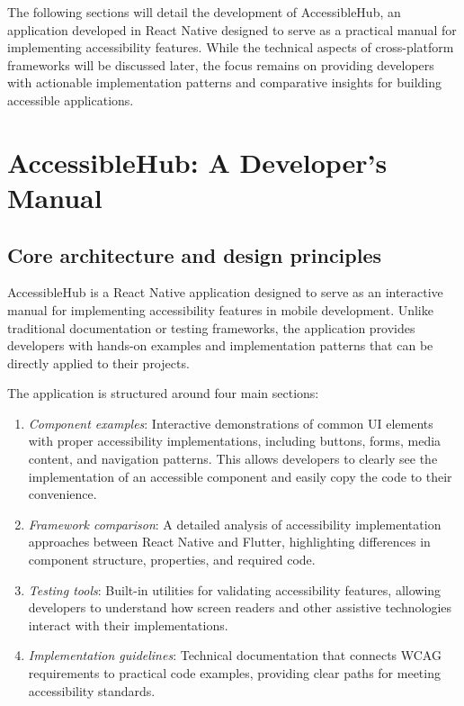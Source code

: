 The following sections will detail the development of AccessibleHub, an application developed in React Native designed to serve as a practical manual for implementing accessibility features. While the technical aspects of cross-platform frameworks will be discussed later, the focus remains on providing developers with actionable implementation patterns and comparative insights for building accessible applications.

\section{AccessibleHub: A Developer's Manual}
\label{sec:accessiblehub}

\subsection{Core architecture and design principles}

AccessibleHub is a React Native application designed to serve as an interactive manual for implementing accessibility features in mobile development. Unlike traditional documentation or testing frameworks, the application provides developers with hands-on examples and implementation patterns that can be directly applied to their projects.

The application is structured around four main sections:
\begin{enumerate}
    \item \textit{Component examples}: Interactive demonstrations of common UI elements with proper accessibility implementations, including buttons, forms, media content, and navigation patterns. This allows developers to clearly see the implementation of an accessible component and easily copy the code to their convenience.
    
    \item \textit{Framework comparison}: A detailed analysis of accessibility implementation approaches between React Native and Flutter, highlighting differences in component structure, properties, and required code.
    
    \item \textit{Testing tools}: Built-in utilities for validating accessibility features, allowing developers to understand how screen readers and other assistive technologies interact with their implementations.
    
    \item \textit{Implementation guidelines}: Technical documentation that connects WCAG requirements to practical code examples, providing clear paths for meeting accessibility standards.
\end{enumerate}

